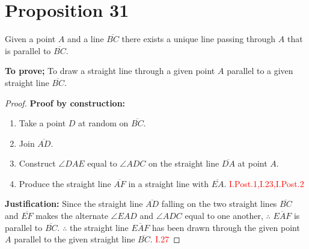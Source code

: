 
\renewcommand\qedsymbol{Q.E.F}

\section*{Proposition 31}

\begin{thm}
Given a point $A$ and a line $\overline{BC}$ there exists a unique line passing through $A$ that is parallel to $\overline{BC}$.
\end{thm}


\textbf{To prove;}
To draw a straight line through a given point $A$ parallel to a given straight line $\overline{BC}$.


\begin{figure}[H]
	\caption{}
\end{figure}

\begin{proof}

\textbf{Proof by construction:}
\begin{enumerate}
    \item Take a point $D$ at random on $\overline{BC}$.
    \item Join $\overline{AD}$.
    \item Construct $\angle{DAE}$ equal to $\angle{ADC}$ on the straight line $\overline{DA}$ at point $A$.
    \item Produce the straight line $\overline{AF}$ in a straight line with $\overline{EA}$. \hfill\textcolor{red}{I.Post.1,I.23,I.Post.2}
\end{enumerate}

\begin{figure}[H]
	\caption{}
\end{figure}

\textbf{Justification:}
Since the straight line $\overline{AD}$ falling on the two straight lines $\overline{BC}$ and $\overline{EF}$ makes the alternate $\angle{EAD}$ and $\angle{ADC}$ equal to one another, $\therefore$ $\overline{EAF}$ is parallel to $\overline{BC}$. $\therefore$ the straight line $\overline{EAF}$ has been drawn through the given point $A$ parallel to the given straight line $\overline{BC}$. \hfill\textcolor{red}{I.27}

\end{proof}

\clearpage

